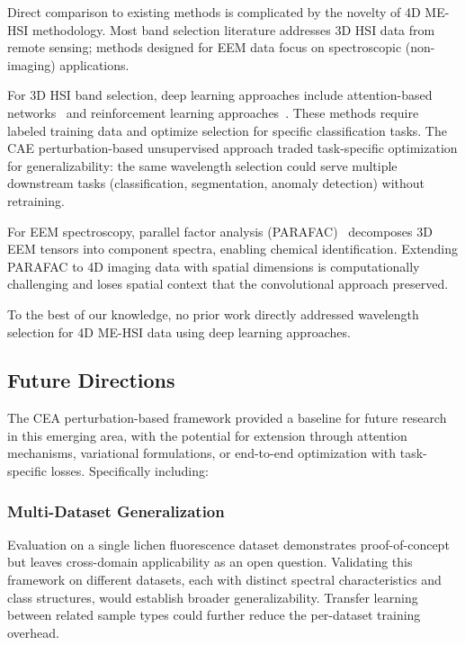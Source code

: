 Direct comparison to existing methods is complicated by the novelty of 4D ME-HSI methodology.
Most band selection literature addresses 3D HSI data from remote sensing; methods designed for EEM data focus on spectroscopic (non-imaging) applications.

For 3D HSI band selection, deep learning approaches include attention-based networks~\cite{mou2017deep} and reinforcement learning approaches~\cite{roy2020hybridsn}.
These methods require labeled training data and optimize selection for specific classification tasks.
The CAE perturbation-based unsupervised approach traded task-specific optimization for generalizability: the same wavelength selection could serve multiple downstream tasks (classification, segmentation, anomaly detection) without retraining.

For EEM spectroscopy, parallel factor analysis (PARAFAC)~\cite{bro1997parafac} decomposes 3D EEM tensors into component spectra, enabling chemical identification.
Extending PARAFAC to 4D imaging data with spatial dimensions is computationally challenging and loses spatial context that the convolutional approach preserved.

To the best of our knowledge, no prior work directly addressed wavelength selection for 4D ME-HSI data using deep learning approaches.


\subsection{Future Directions}
\label{sec:future_work}

The CEA perturbation-based framework provided a baseline for future research in this emerging area, with the potential for extension through attention mechanisms, variational formulations, or end-to-end optimization with task-specific losses. Specifically including: 
\subsubsection{Multi-Dataset Generalization}
Evaluation on a single lichen fluorescence dataset demonstrates
proof-of-concept but leaves cross-domain applicability as an open question.
Validating this framework on different datasets, each with distinct spectral
characteristics and class structures, would establish broader
generalizability. Transfer learning between related sample types could
further reduce the per-dataset training overhead.

